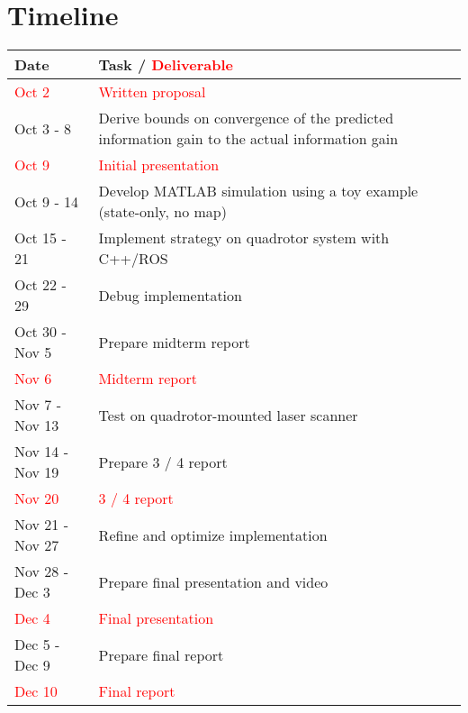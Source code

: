 \section{Timeline}
\begin{table}[!ht]
  \centering
  \begin{tabular}{|l|p{13.5 cm} | } \hline
    \textbf{Date} & \textbf{Task / \textcolor{red}{Deliverable}} \\ \hline
            \textcolor{red}{Oct 2} & \textcolor{red}{Written proposal} \\ \hline
            Oct 3 - 8 & Derive bounds on convergence of the predicted information gain to the actual information gain \\ \hline
            \textcolor{red}{Oct 9} & \textcolor{red}{Initial presentation} \\ \hline
            Oct 9 - 14 & Develop MATLAB simulation using a toy example (state-only, no map) \\ \hline
            Oct 15 - 21 & Implement strategy on quadrotor system with C++/ROS \\ \hline
            Oct 22 - 29 & Debug implementation \\ \hline
            Oct 30 - Nov 5 & Prepare midterm report \\ \hline
            \textcolor{red}{Nov 6} & \textcolor{red}{Midterm report} \\ \hline
            Nov 7 - Nov 13 & Test on quadrotor-mounted laser scanner \\ \hline
            Nov 14 - Nov 19 & Prepare 3 / 4 report \\ \hline
           \textcolor{red}{Nov 20} & \textcolor{red}{3 / 4 report} \\ \hline
             Nov 21 - Nov 27 & Refine and optimize implementation \\ \hline
            Nov 28 - Dec 3 & Prepare final presentation and video \\ \hline
            \textcolor{red}{Dec 4} & \textcolor{red}{Final presentation} \\ \hline
            Dec 5 - Dec 9 & Prepare final report \\ \hline
           \textcolor{red}{Dec 10} & \textcolor{red}{Final report} \\ \hline
  \end{tabular}
  \label{tab:timeline}
\end{table}
